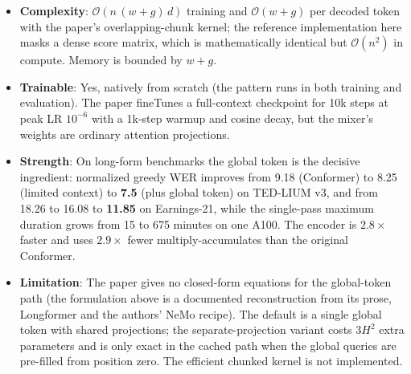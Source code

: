 \begin{itemize}[leftmargin=*]
    \item \textbf{Complexity}: $\mathcal{O}(n\,(w+g)\,d)$ training and $\mathcal{O}(w+g)$ per decoded token with the paper's overlapping-chunk kernel; the reference implementation here masks a dense score matrix, which is mathematically identical but $\mathcal{O}(n^2)$ in compute. Memory is bounded by $w+g$.
    \item \textbf{Trainable}: Yes, natively from scratch (the pattern runs in both training and evaluation). The paper fineTunes a full-context checkpoint for 10k steps at peak LR $10^{-6}$ with a 1k-step warmup and cosine decay, but the mixer's weights are ordinary attention projections.
    \item \textbf{Strength}: On long-form benchmarks the global token is the decisive ingredient: normalized greedy WER improves from 9.18 (Conformer) to 8.25 (limited context) to \textbf{7.5} (plus global token) on TED-LIUM v3, and from 18.26 to 16.08 to \textbf{11.85} on Earnings-21, while the single-pass maximum duration grows from 15 to 675 minutes on one A100. The encoder is $2.8\times$ faster and uses $2.9\times$ fewer multiply-accumulates than the original Conformer.
    \item \textbf{Limitation}: The paper gives no closed-form equations for the global-token path (the formulation above is a documented reconstruction from its prose, Longformer and the authors' NeMo recipe). The default is a single global token with shared projections; the separate-projection variant costs $3H^2$ extra parameters and is only exact in the cached path when the global queries are pre-filled from position zero. The efficient chunked kernel is not implemented.
\end{itemize}
